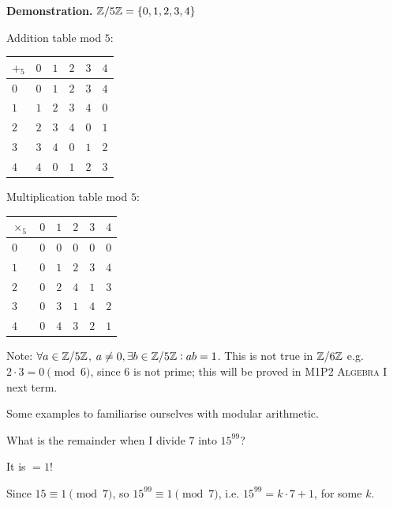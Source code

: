 \documentclass[10pt]{scrartcl}
\begin{document}
\textbf{Demonstration.} $\mathbb{Z}/ 5\mathbb{Z} = \{0,1,2,3,4\}$

Addition table mod $5$: 

\def\arraystretch{1.2}
\begin{table}[h]
\centering 
    \begin{tabular}{l||l|l|l|l|l}
     $+_5$ & $0$ & $1$ & $2$ & $3$ & $4$  \\ \hline \hline 
    $0$ & $0$ & $1$ & $2$ & $3$ & $4$ \\ \hline 
    $1$ & $1$ & $2$ & $3$ & $4$ & $0$ \\ \hline 
   $2$ & $2$ & $3$ & $4$ & $0$ & $1$ \\ \hline 
    $3$ & $3$ & $4$ & $0$ & $1$ & $2$ \\\hline 
    $4$ & $4$ & $0$ & $1$ & $2$ & $3$ \\    
    \end{tabular}
\end{table}

\pagebreak

Multiplication table mod $5$: 
\begin{table}[h]
\centering
    \begin{tabular}{l||l|l|l|l|l}
    $\times_5$ & $0$ & $1$ & $2$ & $3$ & $4$  \\ \hline \hline 
    $0$ & $0$ & $0$ & $0$ & $0$ & $0$ \\ \hline 
    $1$ & $0$ & $1$ & $2$ & $3$ & $4$ \\ \hline 
   $2$ & $0$ & $2$ & $4$ & $1$ & $3$ \\ \hline 
    $3$ & $0$ & $3$ & $1$ & $4$ & $2$ \\\hline 
    $4$ & $0$ & $4$ & $3$ & $2$ & $1$ \\    
    \end{tabular}
\end{table}

Note: $\forall a \in \mathbb{Z} / 5\mathbb{Z}$, $a \neq 0, \exists b \in \mathbb{Z}/ 5 \mathbb{Z} : ab = 1$. This is not true in $\mathbb{Z} / 6\mathbb{Z}$ e.g. $2\cdot 3 = 0\pmod{6}$, since $6$ is not prime; this will be proved in \textsc{M1P2 Algebra I} next term.

Some examples to familiarise ourselves with modular arithmetic. \\

\begin{example}
What is the remainder when I divide $7$ into $15^{99}$? 

It is $= 1$! 

Since $15 \equiv 1\pmod{7}$, so $15^{99} \equiv 1 \pmod{7}$, i.e. $15^{99} = k\cdot 7 + 1$, for some $k$.
\end{example}\vspace*{5pt}
\end{document}
